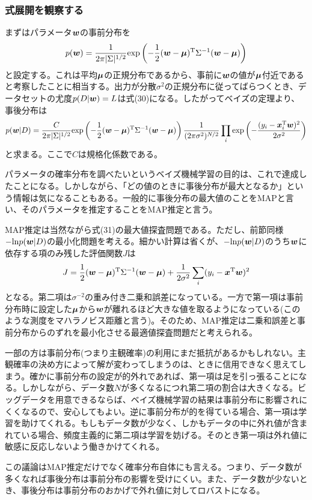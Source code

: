 \documentclass[dvipdfmx, 9pt, a4paper]{jsarticle}
\newcommand{\bm}[1]{{\mbox{\boldmath $#1$}}}
\begin{document}
\subsubsection{式展開を観察する}
まずはパラメータ$\bm w$の事前分布を
\begin{equation}
p(\bm w)=\frac{1}{2\pi|\Sigma|^{1/2}}{\rm exp}\left( -\frac{1}{2}(\bm w-\bm \mu)^{\rm T}
\Sigma^{-1}(\bm w-\bm \mu) \right) \notag
\end{equation}
と設定する。これは平均$\bm \mu$の正規分布であるから、事前に$\bm w$の値が$\bm \mu$付近であると考察したことに相当する。出力が分散$\sigma^2$の正規分布に従ってばらつくとき、データセットの尤度$p(D|\bm w)=L$は式(30)になる。したがってベイズの定理より、事後分布は
\begin{equation}
p(\bm w|D)=\frac{C}{2\pi|\Sigma|^{1/2}}{\rm exp}\left( -\frac{1}{2}(\bm w-\bm \mu)^{\rm T}
\Sigma^{-1}(\bm w-\bm \mu) \right)\frac{1}{(2\pi \sigma^2)^{N/2}}\prod_i {\rm exp}
\left( -\frac{(y_i-\bm x_i^{\rm T}\bm w)^2}{2\sigma^2} \right)
\end{equation}
と求まる。ここで$C$は規格化係数である。\par
パラメータの確率分布を調べたいというベイズ機械学習の目的は、これで達成したことになる。しかしながら、「どの値のときに事後分布が最大となるか」という情報は気になることもある。一般的に事後分布の最大値のことをMAPと言い、そのパラメータを推定することをMAP推定と言う。\par
MAP推定は当然ながら式(31)の最大値探査問題である。ただし、前節同様$-{\rm ln}p(\bm w|D)$の最小化問題を考える。細かい計算は省くが、$-{\rm ln}p(\bm w|D)$のうち$\bm w$に依存する項のみ残した評価関数$J$は
\begin{equation}
J=\frac{1}{2}(\bm w-\bm \mu)^{\rm T}\Sigma^{-1}(\bm w-\bm \mu)+\frac{1}{2\sigma^2}\sum_i(y_i-\bm x^{\rm T}\bm w)^2
\end{equation}
となる。第二項は$\sigma^{-2}$の重み付き二乗和誤差になっている。一方で第一項は事前分布時に設定した$\bm \mu$から$\bm w$が離れるほど大きな値を取るようになっている(このような測度をマハラノビス距離と言う)。そのため、MAP推定は二乗和誤差と事前分布からのずれを最小化させる最適値探査問題だと考えられる。\par
一部の方は事前分布(つまり主観確率)の利用にまだ抵抗があるかもしれない。主観確率の決め方によって解が変わってしまうのは、ときに信用できなく思えてしまう。確かに事前分布の設定が的外れであれば、第一項は足を引っ張ることになる。しかしながら、データ数$N$が多くなるにつれ第二項の割合は大きくなる。ビッグデータを用意できるならば、ベイズ機械学習の結果は事前分布に影響されにくくなるので、安心してもよい。逆に事前分布が的を得ている場合、第一項は学習を助けてくれる。もしもデータ数が少なく、しかもデータの中に外れ値が含まれている場合、頻度主義的に第二項は学習を妨げる。そのとき第一項は外れ値に敏感に反応しないよう働きかけてくれる。\par
この議論はMAP推定だけでなく確率分布自体にも言える。つまり、データ数が多くなれば事後分布は事前分布の影響を受けにくい。また、データ数が少ないとき、事後分布は事前分布のおかげで外れ値に対してロバストになる。
\end{document}

